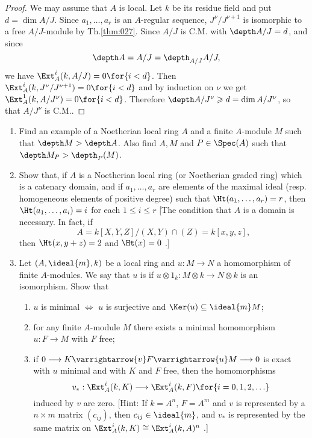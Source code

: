 \documentclass[../main]{subfiles}
\begin{document}
\begin{proof}
We may assume that $A$ is local. Let $k$ be its residue field and put $d=\dim A / J$. Since $a_1, \ldots, a_r$ is an $A$-regular sequence, $J^\nu / J^{\nu+1}$ is isomorphic to a free $A / J$-module by Th.\ref{thm:027}. Since $A / J$ is C.M. with $\depth A / J=d$, and since \[\depth A=A/J=\depth_{A/J}A/J,\] we have $\Ext_A^i(k,A/J)=0\for{i<d}$. Then $\Ext_A^i(k, J^\nu/ J^{\nu+1})=0\for{i<d}$ and by induction on $\nu$ we get \newline $\Ext_A^1(k, A/J^\nu)=0\for{i<d}$. Therefore $\depth A / J^\nu \geqslant d=\dim A / J^\nu$, so that $A / J^\nu$ is C.M..
\end{proof}

\begin{exercise}
\begin{enumerate}[label = \arabic*.]
    \item\label{ex:ch06.1} Find an example of a Noetherian local ring $A$ and a finite $A$-module $M$ such that $\depth M>\depth A$. Also find $A, M$ and \newline $P \in \Spec(A)$ such that $\depth M_P>\depth_P(M)$.
    \item\label{ex:ch06.2} Show that, if $A$ is a Noetherian local ring (or Noetherian graded ring) which is a catenary domain, and if $a_1, \ldots,a_r$ are elements of the maximal ideal (resp. homogeneous elements of positive degree) such that $\Ht(a_1,\ldots,\linebreak a_r)=r$, then $\Ht (a_1, \ldots, a_i)=i$ for each $1 \leqslant i \leqslant r$ [The condition that $A$ is a domain is necessary. In fact, if \[A=k[X, Y, Z] /(X,Y) \cap(Z)=k[x, y, z],\] then $\Ht(x, y+z)=2$ and $\Ht(x)=0$ .]
    \item\label{ex:ch06.3} Let $(A, \ideal{m}, k)$ be a local ring and $u: M \longrightarrow N$ a homomorphism of finite $A$-modules. We say that $u$ is  if $u\otimes 1_k: M \otimes k \longrightarrow N \otimes k$ is an isomorphism. Show that
    \begin{enumerate}
        \item $u$ is minimal $\iff$ $u$ is surjective and $\Ker(u) \subseteq \ideal{m} M$;
        \item for any finite $A$-module $M$ there exists a minimal homomorphism $u:F\longrightarrow M$ with $F$ free;
        \item if $0 \longrightarrow K \varrightarrow{v} F \varrightarrow{u} M \longrightarrow 0$ is exact with $u$ minimal and with $K$ and $F$ free, then the homomorphisms \[v_*: \Ext_A^i(k, K) \longrightarrow \Ext_A^i(k, F)\for{i=0,1,2, \ldots}\] induced by $v$ are zero. [Hint: If $k=A^n$, $F=A^m$ and $v$ is represented by a $n \times m$ matrix $(c_{i j})$, then $c_{i j} \in \ideal{m}$, and $v_*$ is represented by the same matrix on $\Ext_A^i(k, K) \cong \Ext_A^i(k, A)^n$ .]

\end{enumerate}
\end{enumerate}
\end{exercise}
\end{document}

